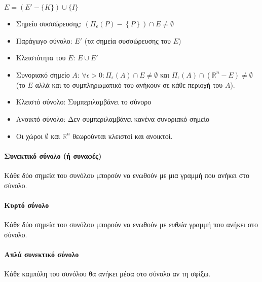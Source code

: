 \documentclass[11pt,a4paper,titlepage]{article}
\begin{document}
\( E = (E' - \lbrace K\rbrace ) \cup \lbrace I\rbrace \)



\begin{itemize}
\item Σημείο συσσώρευσης: \( \left( \Pi_\epsilon(P) - \left\lbrace P \right\rbrace \right) \cap E \neq \emptyset \)
\item Παράγωγο σύνολο: \(Ε'\) (τα σημεία συσσώρευσης του \(Ε\))
\item Κλειστότητα του \(Ε\): \(Ε \cup E'\)
\item Συνοριακό σημείο \(Α\): \(\forall \epsilon > 0: \Pi_\epsilon(A) \cap E \neq \emptyset\) και \(\Pi_\epsilon(A) \cap \left( \mathbb R^n - E \right) \neq \emptyset\) (το \(Ε\) αλλά και το συμπληρωματικό του ανήκουν σε κάθε περιοχή του \(Α\)).
\item Κλειστό σύνολο: Συμπεριλαμβάνει το σύνορο
\item Ανοικτό σύνολο: Δεν συμπεριλαμβάνει κανένα συνοριακό σημείο
\item Οι χώροι \(\emptyset\) και \( \mathbb R ^ n \) θεωρούνται κλειστοί και ανοικτοί.
\end{itemize}

\paragraph{Συνεκτικό σύνολο (ή συναφές)}
Κάθε δύο σημεία του συνόλου μπορούν να ενωθούν με μια γραμμή που ανήκει στο σύνολο.

\paragraph{Κυρτό σύνολο}
Κάθε δύο σημεία του συνόλου μπορούν να ενωθούν με \textit{ευθεία} γραμμή που ανήκει στο σύνολο.

\paragraph{Απλά συνεκτικό σύνολο}
Κάθε καμπύλη του συνόλου θα ανήκει μέσα στο σύνολο αν τη σφίξω.
\end{document}
